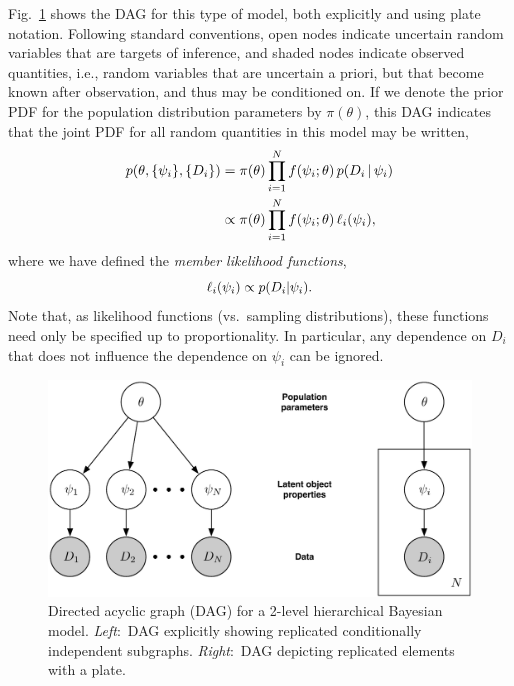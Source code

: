 Fig.~\ref{fig:DAG-2Level} shows the DAG for this type of model, both explicitly and using plate notation.  Following standard conventions, open nodes indicate uncertain random variables that are targets of inference, and shaded nodes indicate observed quantities, i.e., random variables that are uncertain a priori, but that become known after observation, and thus may be conditioned on.
If we denote the prior PDF for the population distribution parameters by $\pi(\theta)$, this DAG indicates that the joint PDF for all random quantities in this model may be written,
\begin{align}
p(\theta, \{\psi_i\}, \{D_i\})
  &= \pi(\theta) \prod_{i=1}^N f(\psi_i;\theta)\, p(D_i \,|\, \psi_i)\\
  &\propto \pi(\theta) \prod_{i=1}^N f(\psi_i;\theta)\, \ell_i(\psi_i),
\label{joint-2level}
\end{align}
where we have defined the \emph{member likelihood functions},
\[
\ell_i(\psi_i) \propto p(D_i|\psi_i).
\label{mlike-def}
\]
Note that, as likelihood functions (vs.\ sampling distributions), these functions need only be specified up to proportionality.
In particular, any dependence on $D_i$ that does not influence the dependence on $\psi_i$ can be ignored.

\begin{figure}
\begin{center}
\includegraphics[width=.8\textwidth]{fig/DAG-2Level-Full+Plate}
\end{center}
\caption{Directed acyclic graph (DAG) for a 2-level hierarchical Bayesian model.
\emph{Left}:~DAG explicitly showing replicated conditionally independent subgraphs.
\emph{Right}:~DAG depicting replicated elements with a plate.}
\label{fig:DAG-2Level}
\end{figure}


